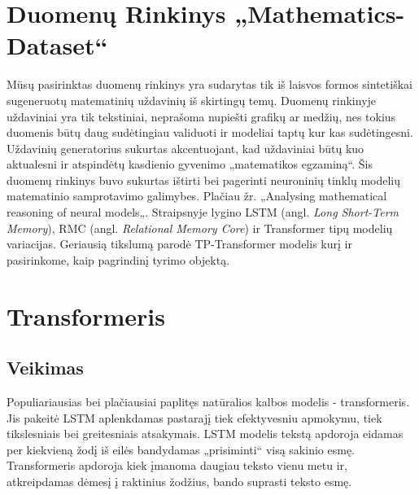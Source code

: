 \documentclass[conference]{IEEEtran}
\begin{document}
\section{Duomenų Rinkinys „Mathematics-Dataset“ \cite{dataset}}


Mūsų pasirinktas duomenų rinkinys yra sudarytas tik iš laisvos formos sintetiškai sugeneruotų matematinių uždavinių iš skirtingų temų. Duomenų rinkinyje uždaviniai yra tik tekstiniai, neprašoma nupiešti grafikų ar medžių, nes tokius duomenis būtų daug sudėtingiau validuoti ir modeliai taptų kur kas sudėtingesni. Uždavinių generatorius sukurtas akcentuojant, kad uždaviniai būtų kuo aktualesni ir atspindėtų kasdienio gyvenimo „matematikos egzaminą“. Šis duomenų rinkinys buvo sukurtas ištirti bei pagerinti neuroninių tinklų modelių matematinio samprotavimo galimybes. Plačiau žr. „Analysing mathematical reasoning of neural models„\cite{deeplab}. Straipsnyje lygino LSTM (angl. \textit{Long Short-Term Memory}), RMC (angl. \textit{Relational Memory Core}) ir Transformer tipų modelių variacijas. Geriausią tikslumą parodė TP-Transformer \cite{tptransformer} modelis kurį ir pasirinkome, kaip pagrindinį tyrimo objektą.






\section{Transformeris}

\subsection{Veikimas}
Populiariausias bei plačiausiai paplitęs natūralios kalbos modelis - transformeris. \cite{deeplab} Jis pakeitė LSTM aplenkdamas pastarajį tiek efektyvesniu apmokymu, tiek tikslesniais bei greitesniais atsakymais. LSTM modelis tekstą apdoroja eidamas per kiekvieną žodį iš eilės bandydamas „prisiminti“ visą sakinio esmę. Transformeris apdoroja kiek įmanoma daugiau teksto vienu metu ir, atkreipdamas dėmesį į raktinius žodžius, bando suprasti teksto esmę.
\end{document}
